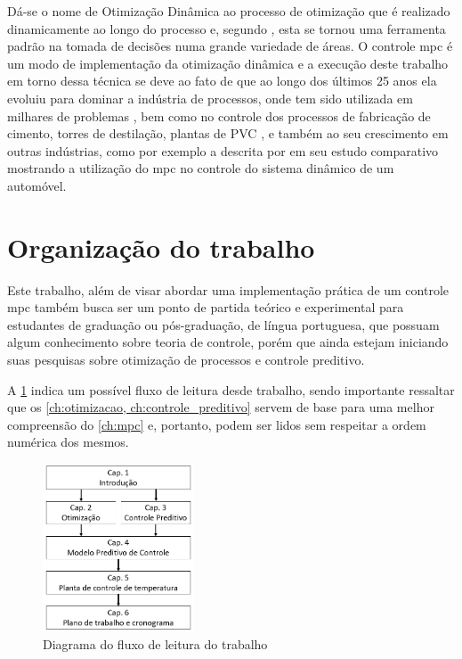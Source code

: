Dá-se o nome de Otimização Dinâmica ao processo de otimização que é realizado
dinamicamente ao longo do processo e, segundo , esta se
tornou uma ferramenta padrão na tomada de decisões numa grande variedade de áreas.
O controle \acrshort{mpc} é um modo de implementação da otimização dinâmica e a execução
deste trabalho em torno dessa técnica se deve ao fato de que ao longo dos últimos 25 anos
ela evoluiu para dominar a indústria de processos, onde tem sido utilizada em milhares
de problemas \cite{Borrelli2017}, bem como no controle dos processos de fabricação de cimento,
torres de destilação, plantas de PVC \cite{Camacho2007}, e também ao seu crescimento em outras
indústrias, como por exemplo a descrita por  em seu estudo comparativo
mostrando a utilização do \acrshort{mpc} no controle do sistema dinâmico de um automóvel.

\section{Organização do trabalho}
\label{sec:organizacao_do_trabalho}

Este trabalho, além de visar abordar uma implementação prática de um controle \acrshort{mpc}
também busca ser um ponto de partida teórico e experimental para estudantes de graduação ou
pós-graduação, de língua portuguesa, que possuam algum conhecimento sobre teoria de controle,
porém que ainda estejam iniciando suas pesquisas sobre otimização de processos e controle preditivo.

A \cref{fig:estrutura_do_trabalho} indica um possível fluxo de leitura desde trabalho, sendo importante
ressaltar que os \cref{ch:otimizacao, ch:controle_preditivo} servem de base para uma melhor
compreensão do \cref{ch:mpc} e, portanto, podem ser lidos sem respeitar a ordem numérica dos mesmos.

\begin{figure}[h]
	\begin{center}
		\includegraphics[width=0.4\textwidth]{./5_images/fig_estrutura_do_trabalho.png} 
		\caption{Diagrama do fluxo de leitura do trabalho}
		\label{fig:estrutura_do_trabalho}
	\end{center}
\end{figure}